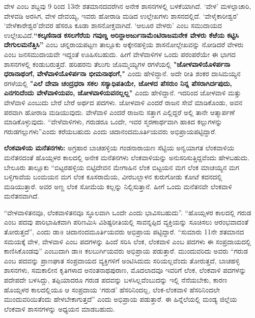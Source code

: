 ವೇಳ ಎಂಬ ಶಬ್ದವು 9 ರಿಂದ 13ನೇ ಶತಮಾನದವರೆಗಿನ ಅನೇಕ ಶಾಸನಗಳಲ್ಲಿ ಬಳಕೆಯಾಗಿದೆ. ‘ವೇಳ’ ಮಳಲ್ಪಾಚಾರಿ, ವೇಳವಡಿ ಅರಸಿಗ, ವೇಳ ದೇವಯ್ಯ, ಇವರು ಹೋರಾಡಿ ಮಡಿದ ಉಲ್ಲೇಖಗಳು ಶಾಸನದಲ್ಲಿದೆ. ‘ವೇಳೈಕಾರೀಶ್ವರ’ ‘ವೇಳೆಕಾರೇಶ್ವರ’ದೇವರ ಹೆಸರೂ ಕೂಡಾ ಶಾಸನೋಕ್ತವಾಗಿದೆ. ‘ಆಲೂರ ವೇಳರು’ ಎಂಬ ಸಮುದಾಯದ ಉಲ್ಲೇಖವಿದೆ.\textbf{“ಕಲ್ಕಣಿನಾಡ ಕಸಲಗೆರೆಯ ಗವುಣ್ಡ ಅರಿನ್ದಾಅರ್ಜುನಾಮೆಂಟಿರಾಜಮನೇಕ ವೇಳರು ಕೆಱೆಯ ಕಟ್ಟಿಸಿ ದೇಗುಲಮನೆತ್ತಿಸಿ”} ಎಂಬ ಚನ್ನರಾಯಪಟ್ಟಣ ತಾಲ್ಲೂಕು ಅಕ್ಕೇನಹಳ್ಳಿಯ ಶಾಸನೋಲ್ಲೇಖವನ್ನು ನೋಡಿದರೆ ವೇಳರು ಎಂಬ ಜನಸಮುದಾಯವೇ ಇದ್ದಂತೆ ಊಹಿಸಬಹುದು. ಹೀಗೆ ವೇಳೆವಾಳಿಗಳ ಒಂದು ಪರಂಪರೆಯೇ ಈ ಭಾಗದ ಶಾಸನಗಳಲ್ಲಿ ಕಂಡುಬರುತ್ತದೆ. ಹರಿಹರನು ತೆಲುಗು ಜೊಮ್ಮಯ್ಯಗಳ ರಗಳೆಯಲ್ಲಿ \textbf{"ಜೋಳವಾಳಿಯೊಳಿರ್ಪನಾ ಧರಾನಾಥಂಗೆ, ವೇಳೆವಾಳಿಯೊಳಿರ್ಪನಾ ಭೀಮನಾಥಂಗೆ,"} ಎಂದು ಹೇಳಿದ್ದಾನೆ. ಅದೇ ರೀತಿ ಶಂಕರ ದಾಸಿಮಯ್ಯನ ರಗಳೆಯಲ್ಲಿ \textbf{"ಎಲೆ ದೇವಾ ಚಂದ್ರಧರಾ ಸಕಲ ಸಸ್ಯಾಧಿಪತಿಯೇ, ಜೋಳದ ಪೆಸರುಂ ನಿನ್ನ ಪೆಸರಾಗಿರ್ದಪುದು, ಎನಗರಿದೆಂದು ವೇಳೆವಾಳಿಯವಂ, ಜೋಳವಾಳಿಯವನಲ್ಲಲ್ಲ"} ಎಂದು ಹೇಳಿದ್ದಾನೆ. ಇದರಿಂದ ಜೋಳವಾಳಿ ಮತ್ತು ವೇಳೆವಾಳಿ ಎಂಬುದು ಬೇರೆ ಬೇರೆ ಅರ್ಥದ ಪದಗಳು. ಜೋಳವಾಳಿ ಎಂದರೆ ರಾಜನ ಸೇವೆ ಮಾಡಿಕೊಂಡು, ಅವನ ಪರವಾಗಿ ಹೋರಾಡಿ ಮಡಿಯುವುದು. ವೇಳೆವಾಳಿ ಎಂದರೆ ರಾಜನು ಸತ್ತಾಗ ಎಲ್ಲಿದ್ದರೆ ಅಲ್ಲಿ ತಾನೇ ಆತ್ಮಾರ್ಪಣೆ ಮಾಡಿಕೊಳ್ಳುವುದು. “ವೇಳೆವಾಳಿಗಳು, ಗರುಡರೂ ಒಂದೇ, ಇವರ ಸ್ಮರಣಾರ್ಥವಾಗಿ ಹಾಕಿದ ಕಲ್ಲುಗಳನ್ನು ಗರುಡಗಲ್ಲುಗಳು”ಎಂದು ಕರೆಯಬಹುದು ಎಂದು ಚಿದಾನಂದಮೂರ್ತಿಯವರು ಅಭಿಪ್ರಾಯಪಟ್ಟಿದ್ದಾರೆ.

\newpage

\textbf{ಲೆಂಕವಾಳಿಯ ಮನೆತನಗಳು:} ಅಗ್ರಹಾರ ಬಾಚಹಳ್ಳಿಯ ಗಂಡನಾರಾಯಣ ಸೆಟ್ಟಿಯ ಅನ್ವಯಾಗತ ಲೆಂಕವಾಳಿಯ ಮನೆತನದಂತೆ ಹೊಯ್ಸಳರ ಕಾಲದಲ್ಲಿ ಅನೇಕ ಮನೆತನಗಳು ಲೆಂಕವಾಳಿಯನ್ನು ಅನುಸರಿಸುತ್ತಿದ್ದವೆಂದು ಹೇಳಬಹುದು. ಬೇಲೂರು ತಾಲ್ಲೂಕು “ಬಿಟ್ಟರಹಳ್ಳಿಯ ಬಿಟ್ಟಿದೇವನ ಮೇಗಾಹಿನ ಲೆಂಕ ಬಿಟ್ಟಯನ ಮಗ ಲೆಂಕ ಮಾಚಯ್ಯನ ಮಗ ಬಳ್ಳಿಗಾವೆಯ ಬಂಮಯನ ಮಗ ಲೆಂಕ ಕೂಸರಾಮೆಯ, ವೀರಬಲ್ಲಾಳನ ಕುರುಗೋಡು ಕೋಟೆ ಕದನದಲ್ಲಿ ಮಡಿಯುತ್ತಾರೆ. ಅವರ ಅಣ್ಣ ಲೆಂಕ ಸೋಮೆಯ ಕಲ್ಲನ್ನು ನಿಲ್ಲಿಸುತ್ತಾನೆ. ಹೀಗೆ ಒಂದು ಮನೆತನವೇ ಲೆಂಕವಾಳಿ ಮನೆತನವಾಗಿದೆ.

“ವೇಳವಾಳಿತನವೂ, ಲೆಂಕವಾಳಿತನವೂ ಸ್ಥೂಲವಾಗಿ ಒಂದೇ ಎಂದು ಭಾವಿಸಬಹುದು”. “ಹೊಯ್ಸಳರ ಕಾಲದಲ್ಲಿ ಗರುಡ ಎಂಬ ಪದವು ಪಾರಿಭಾಷಿಕವಾಗಿ ಪರಿಣಮಿಸಿ ವಿಶಿಷ್ಟರೀತಿಯಲ್ಲಿ ಸಾವನ್ನಪ್ಪಿದ ವ್ಯಕ್ತಿಯನ್ನು ಸೂಚಿಸಲು ಆರಂಭವಾದಂತೆ ತೋರುತ್ತದೆ”, ಎಂದು ಡಾ॥ ಚಿದಾನಂದಮೂರ್ತಿಯವರು ಅಭಿಪ್ರಾಯ ಪಟ್ಟಿದ್ದಾರೆ. “ಸುಮಾರು 11ನೇ ಶತಮಾನದ ಸಮಯಕ್ಕೆ ವೇಳ, ವೇಳವಾಳಿ ಎಂಬ ಪದಗಳನ್ನು ಹಿಂದೆ ಸರಿಸಿ ಲೆಂಕ, ಲೆಂಕವಾಳಿ ಎಂಬ ಪದಗಳು ಈ ಸಂಪ್ರದಾಯದಲ್ಲಿ ಕಾಣಿಸಿಕೊಂಡವು” ಎಂಬುದಾಗಿ ಡಾ॥ ಕಲಬುರ್ಗಿಯವರು ಅಭಿಪ್ರಾಯ ಪಡುತ್ತಾರೆ. ಮುಂದುವರಿದು ಅವರು “ಗರುಡ ಎಂಬ ಪದವನ್ನು ಪ್ರಾಣಘಾತ ಸಂಪ್ರದಾಯದ ವ್ಯಕ್ತಿಗಳಿಗೆ ಅಂಟಿಸಿದುದು ಸರಿಯಲ್ಲವೆಂದು ತೋರುತ್ತದೆ, ಬಾಚಹಳ್ಳಿ ಶಾಸನಗಳು, ಸಮಕಾಲೀನ ಕೃತಿಗಳಾದ ಅನಂತನಾಥಪುರಾಣ, ಮೊದಲಾದವೂ ಇವರಿಗೆ ಲೆಂಕ, ಲೆಂಕವಾಳಿ ಪದಗಳನ್ನು ಪದೇಪದೇ ಬಳಸಿದ್ದು, ತಪ್ಪಿಯಾದರೂ ಗರುಡ ಪದವನ್ನು ಬಳಸಿಲ್ಲವೆಂಬುದನ್ನು ಇಲ್ಲಿ ನೆನೆಯಬೇಕು, ಕಾರಣ ಹೊಯ್ಸಳರ ಕಾಲದಲ್ಲಿಯೂ ಆ ಸಂಪ್ರದಾಯ ‘ಗರುಡ’ ಹೆಸರಿನಿಂದಲ್ಲ, ಲೆಂಕ-ಲೆಂಕವಾಳಿ ಹೆಸರಿನಿಂದಲೇ ಮುಂದುವರಿಯಿತೆಂದು ಹೇಳಬೇಕಾಗುತ್ತದೆ” ಎಂದು ಅಭಿಪ್ರಾಯ ಪಡುತ್ತಾರೆ. ಈ ಹಿನ್ನೆಲೆಯಲ್ಲಿ ಮಂಡ್ಯ ಜಿಲ್ಲೆಯ ಲೆಂಕವಾಳಿ ಶಾಸನಗಳನ್ನು ಅಧ್ಯಯನ ಮಾಡಬಹುದು.

